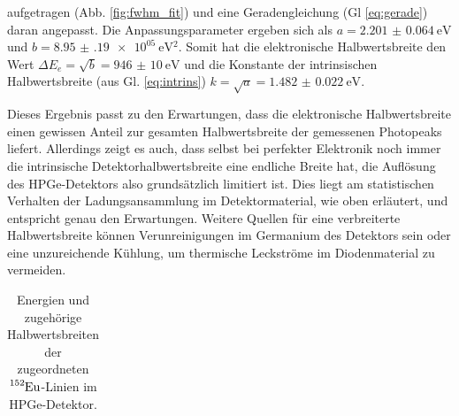 aufgetragen (Abb. \ref{fig:fwhm_fit}) und eine Geradengleichung (Gl \eqref{eq:gerade}) daran angepasst. Die Anpassungsparameter ergeben sich als $a = \SI{2.201(64)}{\electronvolt}$ und $b = \SI{8.95(19)e+05}{\electronvolt^2}$.
Somit hat die elektronische Halbwertsbreite den Wert $\Delta E_e = \sqrt{b} = \SI{946(10)}{\electronvolt}$ und die Konstante der intrinsischen Halbwertsbreite (aus Gl. \ref{eq:intrins}) $k = \sqrt{a} = \SI{1.482(22)}{\electronvolt}$.

Dieses Ergebnis passt zu den Erwartungen, dass die elektronische Halbwertsbreite einen gewissen Anteil zur gesamten Halbwertsbreite der gemessenen Photopeaks liefert. Allerdings zeigt es auch, dass selbst bei perfekter Elektronik noch immer die intrinsische Detektorhalbwertsbreite eine endliche Breite hat, die Auflösung des HPGe-Detektors also grundsätzlich limitiert ist. Dies liegt am statistischen Verhalten der Ladungsansammlung im Detektormaterial, wie oben erläutert, und entspricht genau den Erwartungen. Weitere Quellen für eine verbreiterte Halbwertsbreite können Verunreinigungen im Germanium des Detektors sein \cite[219]{leotechniques} oder eine unzureichende Kühlung, um thermische Leckströme im Diodenmaterial zu vermeiden.

\begin{table}[H]
    \centering
    \begin{tabular}{|c|c|c|} \hline
    
    \end{tabular}
    \caption{Energien und zugehörige Halbwertsbreiten der zugeordneten $\ce{^152Eu}$-Linien im HPGe-Detektor.}
    \label{tab:fwhm_eu}
\end{table}


